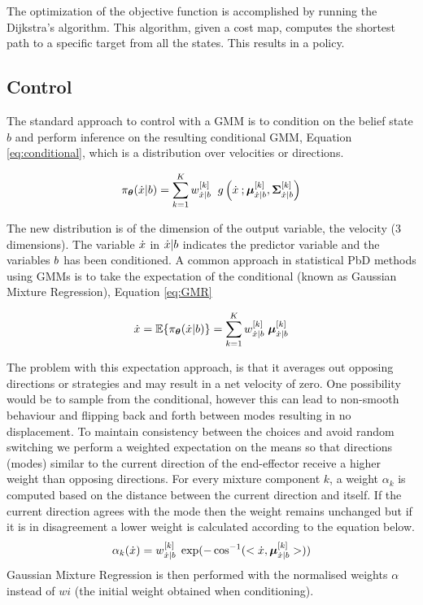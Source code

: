 The optimization of the objective function is accomplished by running the Dijkstra's algorithm. This algorithm, given a cost map, 
computes the shortest path to a specific target from all the states. This results in a policy.

\subsection{Control}\label{sub:ch3:control}
The standard approach to control with a GMM is to condition on the belief state $b$ and perform inference on the resulting conditional
GMM, Equation \ref{eq:conditional}, which is a distribution over velocities or directions.

\begin{equation} \label{eq:conditional}
  \pi_{\boldsymbol{\theta}}(\dot{x}|b) = \sum\limits_{k=1}^{K} w^{[k]}_{\dot{x}|b} \;\;  g\left(\dot{x}\: ;  \boldsymbol{\mu}^{[k]}_{\dot{x}|b}, \boldsymbol{\Sigma}^{[k]}_{\dot{x}|b} \right)
\end{equation}

The new distribution is of the dimension of the output variable, the velocity (3 dimensions). 
The variable $\dot{x}$ in $\dot{x}|b$ indicates the predictor variable and the variables $b$ has been conditioned.
A common approach in statistical PbD methods using GMMs is to take the expectation of the conditional (known as Gaussian Mixture Regression), Equation \ref{eq:GMR}

\begin{equation} \label{eq:GMR}
 \dot{x} = \mathbb{E}\{\pi_{\boldsymbol{\theta}}(\dot{x}|b)\} = \sum\limits_{k=1}^{K}  w^{[k]}_{\dot{x}|b} \; \boldsymbol{\mu}^{[k]}_{\dot{x}|b}
\end{equation}

The problem with this expectation approach, is that it averages out opposing directions or strategies and may result in 
a net velocity of zero. One possibility would be to sample from the conditional, however this can lead to non-smooth 
behaviour and flipping back and forth between modes resulting in no displacement. To maintain consistency between the
choices and avoid random switching  we perform a weighted expectation on the means so that 
directions (modes) similar to the current direction of the end-effector receive
a higher weight than opposing directions. For every mixture component $k$, a weight $\alpha_k$ is computed based 
on the distance between the current direction and itself.
If the current direction agrees with the mode then the weight remains unchanged but if it is in
disagreement a lower weight is
calculated according to the equation below. 
\begin{equation}  \label{eq:weight}
  \alpha_{k}(\dot{x}) = w^{[k]}_{\dot{x}|b} \; \exp(-\cos^{-1}(<\dot{x},\boldsymbol{\mu}^{[k]}_{\dot{x}|b}>))
\end{equation}
Gaussian Mixture Regression is then performed with the normalised  weights $\alpha$ instead of $wi$
(the initial weight obtained when conditioning).

